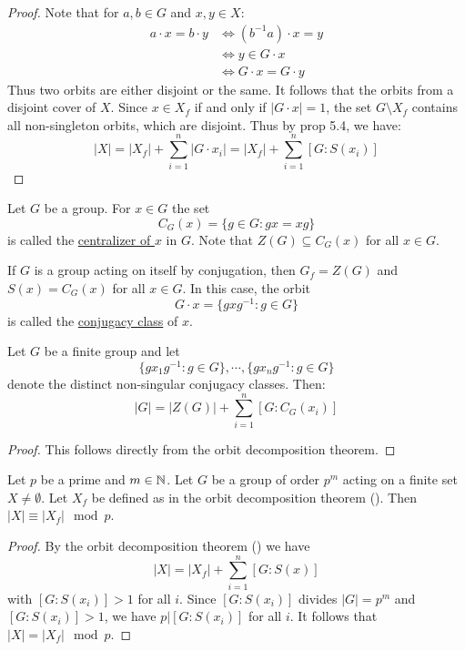 \documentclass[11pt]{article}
\begin{document}
\begin{proof}
    Note that for $a,b\in G$ and $x,y\in X$:
    \begin{align*}
        a\cdot x=b\cdot y&\iff(b^{-1}a)\cdot x=y \\
        &\iff y\in G\cdot x \\
        &\iff G\cdot x=G\cdot y
    \end{align*}
    Thus two orbits are either disjoint or the same. It follows that the orbits from a disjoint cover of $X$. Since $x\in X_f$ if and only if $|G\cdot x|=1$, the set $G\setminus X_f$ contains all non-singleton orbits, which are disjoint. Thus by prop 5.4, we have:
    \[|X|=|X_f|+\sum\limits_{i=1}^n|G\cdot x_i|=|X_f|+\sum\limits_{i=1}^n[G:S(x_i)]\]
\end{proof}

\begin{definition}[Centralizers]
    Let $G$ be a group. For $x\in G$ the set
    \[C_G(x)=\{g\in G:gx=xg\}\]
    is called the \ul{centralizer of $x$} in $G$. Note that $Z(G)\subseteq C_G(x)$ for all $x\in G$.
\end{definition}

\begin{remark}
    If $G$ is a group acting on itself by conjugation, then $G_f=Z(G)$ and $S(x)=C_G(x)$ for all $x\in G$. In this case, the orbit $$G\cdot x=\{gxg^{-1}:g\in G\}$$ is called the \ul{conjugacy class} of $x$.
\end{remark}

\begin{corollary}
    Let $G$ be a finite group and let $$\{gx_1g^{-1}:g\in G\},\cdots,\{gx_ng^{-1}:g\in G\}$$
    denote the distinct non-singular conjugacy classes. Then:
    \[|G|=|Z(G)|+\sum\limits_{i=1}^n[G:C_G(x_i)]\]
\end{corollary}

\begin{proof}
    This follows directly from the orbit decomposition theorem.
\end{proof}

\begin{lemma}
    Let $p$ be a prime and $m\in\mathbb{N}$. Let $G$ be a group of order $p^m$ acting on a finite set $X\neq\emptyset$. Let $X_f$ be defined as in the orbit decomposition theorem (). Then $|X|\equiv|X_f|\mod{p}$.
\end{lemma}

\begin{proof}
    By the orbit decomposition theorem () we have
    \[|X|=|X_f|+\sum\limits_{i=1}^n[G:S(x)]\]
    with $[G:S(x_i)]>1$ for all $i$. Since $[G:S(x_i)]$ divides $|G|=p^m$ and $[G:S(x_i)]>1$, we have $p|[G:S(x_i)]$ for all $i$. It follows that $|X|=|X_f|\mod{p}$.
\end{proof}
\end{document}
